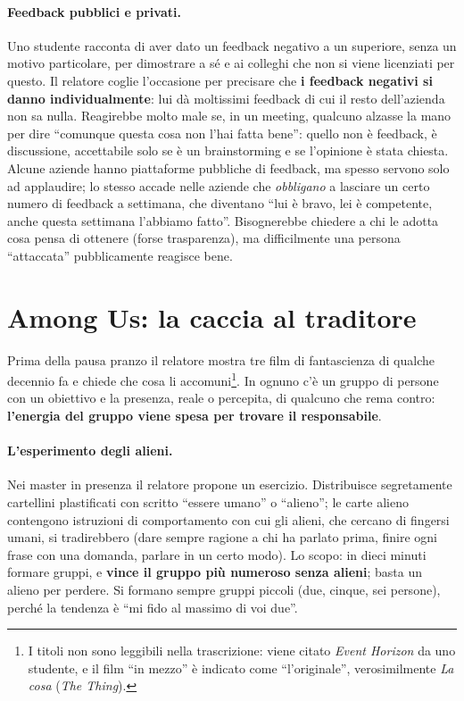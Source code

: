 \paragraph{Feedback pubblici e privati.} Uno studente racconta di aver dato un
feedback negativo a un superiore, senza un motivo particolare, per dimostrare
a sé e ai colleghi che non si viene licenziati per questo. Il relatore coglie
l'occasione per precisare che \textbf{i feedback negativi si danno
individualmente}: lui dà moltissimi feedback di cui il resto dell'azienda non
sa nulla. Reagirebbe molto male se, in un meeting, qualcuno alzasse la mano per
dire ``comunque questa cosa non l'hai fatta bene'': quello non è feedback, è
discussione, accettabile solo se è un brainstorming e se l'opinione è stata
chiesta. Alcune aziende hanno piattaforme pubbliche di feedback, ma spesso
servono solo ad applaudire; lo stesso accade nelle aziende che
\emph{obbligano} a lasciare un certo numero di feedback a settimana, che
diventano ``lui è bravo, lei è competente, anche questa settimana l'abbiamo
fatto''. Bisognerebbe chiedere a chi le adotta cosa pensa di ottenere (forse
trasparenza), ma difficilmente una persona ``attaccata'' pubblicamente reagisce
bene.

\section{Among Us: la caccia al traditore}
\label{sec:z1-among-us}

Prima della pausa pranzo il relatore mostra tre film di fantascienza di
qualche decennio fa e chiede che cosa li accomuni\footnote{I titoli non sono
leggibili nella trascrizione: viene citato \emph{Event Horizon} da uno
studente, e il film ``in mezzo'' è indicato come ``l'originale'',
verosimilmente \emph{La cosa} (\emph{The Thing}).}. In ognuno c'è un gruppo di
persone con un obiettivo e la presenza, reale o percepita, di qualcuno che
rema contro: \textbf{l'energia del gruppo viene spesa per trovare il
responsabile}.

\paragraph{L'esperimento degli alieni.} Nei master in presenza il relatore
propone un esercizio. Distribuisce segretamente cartellini plastificati con
scritto ``essere umano'' o ``alieno''; le carte alieno contengono istruzioni di
comportamento con cui gli alieni, che cercano di fingersi umani, si
tradirebbero (dare sempre ragione a chi ha parlato prima, finire ogni frase
con una domanda, parlare in un certo modo). Lo scopo: in dieci minuti formare
gruppi, e \textbf{vince il gruppo più numeroso senza alieni}; basta un alieno
per perdere. Si formano sempre gruppi piccoli (due, cinque, sei persone),
perché la tendenza è ``mi fido al massimo di voi due''.


